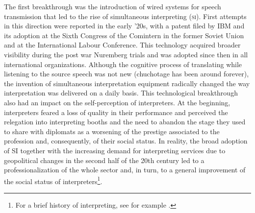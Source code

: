 \documentclass[output=paper]{langsci/langscibook}
\begin{document}
The first breakthrough was the introduction of wired systems for speech transmission that led to the rise of simultaneous interpreting (\textsc{si}). First attempts in this direction were reported in the early ’20s, with a patent filed by IBM and its adoption at the Sixth Congress of the Comintern in the former Soviet Union and at the International Labour Conference. This technology acquired broader visibility during the post war Nuremberg trials and was adopted since then in all international organizations. Although the cognitive process of translating while listening to the source speech was not new (chuchotage has been around forever), the invention of simultaneous interpretation equipment radically changed the way interpretation was delivered on a daily basis. This technological breakthrough also had an impact on the self-perception of interpreters. At the beginning, interpreters feared a loss of quality in their performance and perceived the relegation into interpreting booths and the need to abandon the stage they used to share with diplomats as a worsening of the prestige associated to the profession and, consequently, of their social status. In reality, the broad adoption of SI together with the increasing demand for interpreting services due to geopolitical changes in the second half of the 20th century led to a professionalization of the whole sector and, in turn, to a general improvement of the social status of interpreters\footnote{For a brief history of interpreting, see for example \citep{takeda_new_2016}.}. 
 
\end{document}
